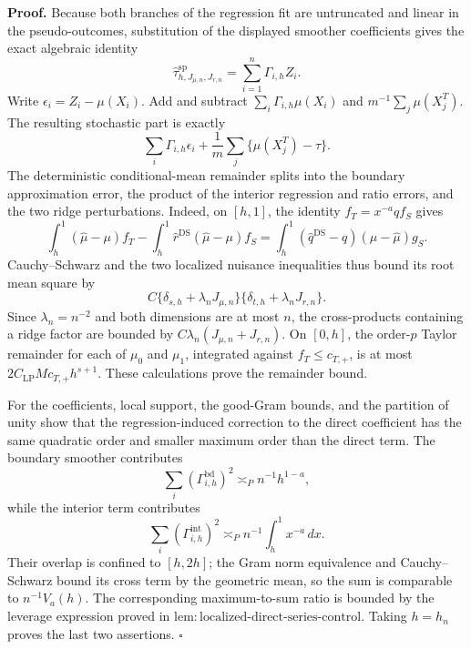 \textbf{Proof.}
Because both branches of the regression fit are untruncated and linear in the pseudo-outcomes, substitution of the displayed smoother coefficients gives the exact algebraic identity
\[
\widehat\tau^{\mathrm{sp}}_{h,J_{\mu,n},J_{r,n}}=\sum_{i=1}^n\Gamma_{i,h}Z_i.
\]
Write \(\epsilon_i=Z_i-\mu(X_i)\).  Add and subtract \(\sum_i\Gamma_{i,h}\mu(X_i)\) and \(m^{-1}\sum_j\mu(X_j^T)\).  The resulting stochastic part is exactly
\[
\sum_i\Gamma_{i,h}\epsilon_i+\frac1m\sum_j\{\mu(X_j^T)-\tau\}.
\]
The deterministic conditional-mean remainder splits into the boundary approximation error, the product of the interior regression and ratio errors, and the two ridge perturbations.  Indeed, on \([h,1]\), the identity \(f_T=x^{-a}qf_S\) gives
\[
\int_h^1(\widehat\mu-\mu)f_T
-\int_h^1\widehat r^{\mathrm{DS}}(\widehat\mu-\mu)f_S
=\int_h^1(\widehat q^{\mathrm{DS}}-q)(\mu-\widehat\mu)g_S.
\]
Cauchy--Schwarz and the two localized nuisance inequalities thus bound its root mean square by
\[
C\{\delta_{s,h}+\lambda_nJ_{\mu,n}\}
  \{\delta_{t,h}+\lambda_nJ_{r,n}\}.
\]
Since \(\lambda_n=n^{-2}\) and both dimensions are at most \(n\), the cross-products containing a ridge factor are bounded by \(C\lambda_n(J_{\mu,n}+J_{r,n})\).  On \([0,h]\), the order-\(p\) Taylor remainder for each of \(\mu_0\) and \(\mu_1\), integrated against \(f_T\le c_{T,+}\), is at most \(2C_{\mathrm{LP}}Mc_{T,+}h^{s+1}\).  These calculations prove the remainder bound.

For the coefficients, local support, the good-Gram bounds, and the partition of unity show that the regression-induced correction to the direct coefficient has the same quadratic order and smaller maximum order than the direct term.  The boundary smoother contributes
\[
\sum_i(\Gamma^{\mathrm{bd}}_{i,h})^2\asymp_P n^{-1}h^{1-a},
\]
while the interior term contributes
\[
\sum_i(\Gamma^{\mathrm{int}}_{i,h})^2\asymp_P n^{-1}\int_h^1x^{-a}\,dx.
\]
Their overlap is confined to \([h,2h]\); the Gram norm equivalence and Cauchy--Schwarz bound its cross term by the geometric mean, so the sum is comparable to \(n^{-1}V_a(h)\).  The corresponding maximum-to-sum ratio is bounded by the leverage expression proved in \(\mathrm{lem:localized\text{-}direct\text{-}series\text{-}control}\).  Taking \(h=h_n\) proves the last two assertions. \(\square\)